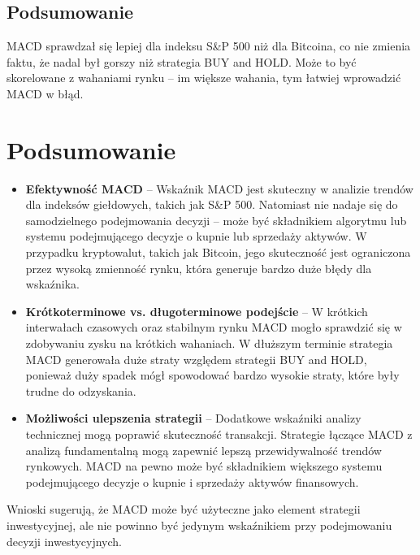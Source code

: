 \documentclass[12pt, letterpaper]{article}
\begin{document}
\subsection{Podsumowanie}
MACD sprawdzał się lepiej dla indeksu S\&P 500 niż dla Bitcoina, co nie zmienia faktu, że nadal był gorszy niż strategia BUY and HOLD.
Może to być skorelowane z wahaniami rynku – im większe wahania, tym łatwiej wprowadzić MACD w błąd.
\vspace{2cm} 
\section{Podsumowanie}
\begin{itemize}
    \item \textbf{Efektywność MACD} – Wskaźnik MACD jest skuteczny w analizie trendów dla indeksów giełdowych, takich jak S\&P 500. Natomiast nie nadaje się do samodzielnego podejmowania decyzji – może być składnikiem algorytmu lub systemu podejmującego decyzje o kupnie lub sprzedaży aktywów. W przypadku kryptowalut, takich jak Bitcoin, jego skuteczność jest ograniczona przez wysoką zmienność rynku, która generuje bardzo duże błędy dla wskaźnika.
    \item \textbf{Krótkoterminowe vs. długoterminowe podejście} – W krótkich interwałach czasowych oraz stabilnym rynku MACD mogło sprawdzić się w zdobywaniu zysku na krótkich wahaniach. W dłuższym terminie strategia MACD generowała duże straty względem strategii BUY and HOLD, ponieważ duży spadek mógł spowodować bardzo wysokie straty, które były trudne do odzyskania.
    \item \textbf{Możliwości ulepszenia strategii} – Dodatkowe wskaźniki analizy technicznej mogą poprawić skuteczność transakcji. Strategie łączące MACD z analizą fundamentalną mogą zapewnić lepszą przewidywalność trendów rynkowych. MACD na pewno może być składnikiem większego systemu podejmującego decyzje o kupnie i sprzedaży aktywów finansowych.
\end{itemize}
Wnioski sugerują, że MACD może być użyteczne jako element strategii inwestycyjnej, ale nie powinno być jedynym wskaźnikiem przy podejmowaniu decyzji inwestycyjnych.
\end{document}
